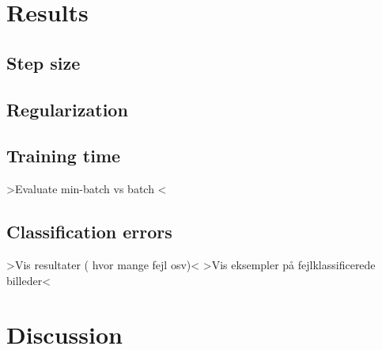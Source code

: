 \documentclass[a4paper,10pt,article,oneside,english]{memoir}
\begin{document}
\chapter{Results}\label{sec:res}


\section{Step size}\label{sec:stepsize}


\section{Regularization}\label{sec:reg}


\section{Training time}
>Evaluate min-batch vs batch <

\section{Classification errors}
>Vis resultater ( hvor mange fejl osv)<
>Vis eksempler på fejlklassificerede billeder<


\chapter{Discussion}
	
\end{document}
